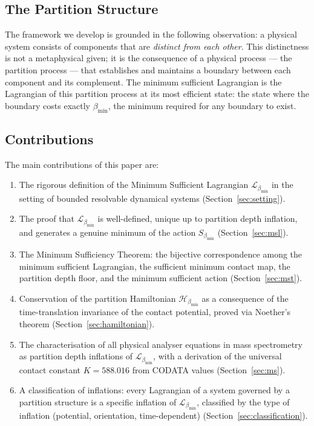 \documentclass[12pt, a4paper]{article}
\theoremstyle{plain}
\theoremstyle{definition}
\theoremstyle{remark}
\newcommand{\bmin}{\beta_{\min}}
\newcommand{\Lmin}{\mathcal{L}_{\bmin}}
\newcommand{\Smin}{S_{\bmin}}
\newcommand{\Hmin}{\mathcal{H}_{\bmin}}
\begin{document}
\subsection{The Partition Structure}

The framework we develop is grounded in the following observation: a physical
system consists of components that are \emph{distinct from each other}. This
distinctness is not a metaphysical given; it is the consequence of a physical
process --- the partition process --- that establishes and maintains a boundary
between each component and its complement. The minimum sufficient Lagrangian is
the Lagrangian of this partition process at its most efficient state: the state
where the boundary costs exactly $\bmin$, the minimum required for any boundary
to exist.

\subsection{Contributions}

The main contributions of this paper are:

\begin{enumerate}[label=(\roman*)]
\item The rigorous definition of the Minimum Sufficient Lagrangian $\Lmin$ in
  the setting of bounded resolvable dynamical systems
  (Section~\ref{sec:setting}).

\item The proof that $\Lmin$ is well-defined, unique up to partition depth
  inflation, and generates a genuine minimum of the action $\Smin$
  (Section~\ref{sec:msl}).

\item The Minimum Sufficiency Theorem: the bijective correspondence among the
  minimum sufficient Lagrangian, the sufficient minimum contact map, the
  partition depth floor, and the minimum sufficient action
  (Section~\ref{sec:mst}).

\item Conservation of the partition Hamiltonian $\Hmin$ as a consequence of
  the time-translation invariance of the contact potential, proved via
  Noether's theorem (Section~\ref{sec:hamiltonian}).

\item The characterisation of all physical analyser equations in mass
  spectrometry as partition depth inflations of $\Lmin$, with a derivation of
  the universal contact constant $K = 588.016$ from CODATA values
  (Section~\ref{sec:ms}).

\item A classification of inflations: every Lagrangian of a system governed by
  a partition structure is a specific inflation of $\Lmin$, classified by the
  type of inflation (potential, orientation, time-dependent)
  (Section~\ref{sec:classification}).
\end{enumerate}
\end{document}
